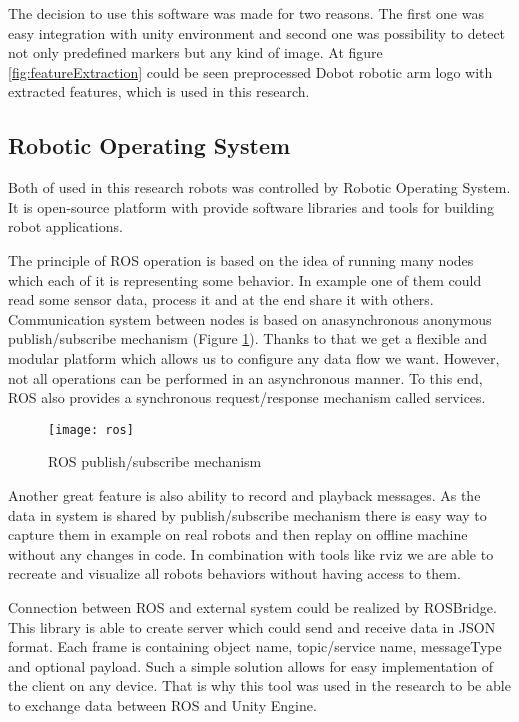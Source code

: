 \documentclass[printmode,en]{mgr}
\begin{document}
The decision to use this software was made for two reasons. The first one was easy integration with unity environment and second one was possibility to detect not only predefined markers but any kind of image. At figure \ref{fig:featureExtraction} could be seen preprocessed Dobot robotic arm logo with extracted features, which is used in this research.

\subsection{Robotic Operating System}
Both of used in this research robots was controlled by Robotic Operating System. It is open-source platform with provide software libraries and tools for building robot applications.

The principle of ROS operation is based on the idea of running many nodes which each of it is representing some behavior. In example one of them could read some sensor data, process it and at the end share it with others. Communication system between nodes is based on anasynchronous anonymous publish/subscribe mechanism (Figure \ref{fig:ros}). Thanks to that we get a flexible and modular platform which allows us to configure any data flow we want. However, not all operations can be performed in an asynchronous manner. To this end, ROS also provides a synchronous request/response mechanism called services.

\begin{figure}[!ht]
  \centering
    \texttt{[image: ros]}
  \caption{ROS publish/subscribe mechanism}
  \label{fig:ros}
\end{figure}

Another great feature is also ability to record and playback messages. As the data in system is shared by publish/subscribe mechanism there is easy way to capture them in example on real robots and then replay on offline machine without any changes in code. In combination with tools like rviz we are able to recreate and visualize all robots behaviors without having access to them.

Connection between ROS and external system could be realized by ROSBridge. This library is able to create server which could send and receive data in JSON format. Each frame is containing object name, topic/service name, messageType and optional payload. Such a simple solution allows for easy implementation of the client on any device. That is why this tool was used in the research to be able to exchange data between ROS and Unity Engine.
\end{document}

